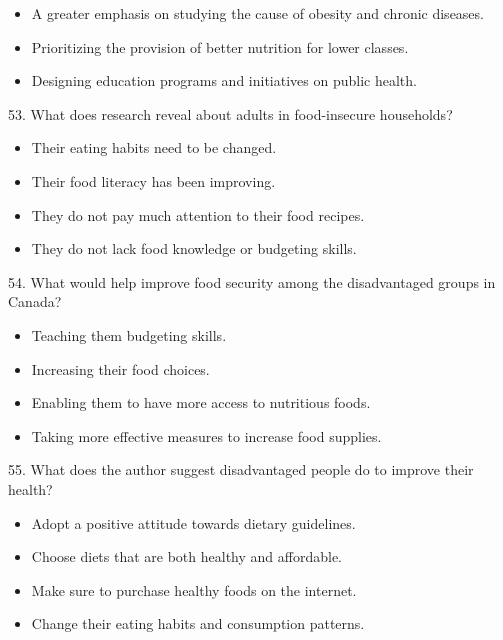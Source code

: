 \documentclass[UTF8,11pt]{ctexart}
\begin{document}
\begin{itemize}[leftmargin=2em,itemsep=.2em,topsep=.4em]\item[B.] A greater emphasis on studying the cause of obesity and chronic diseases.
\item[C.] Prioritizing the provision of better nutrition for lower classes.
\item[D.] Designing education programs and initiatives on public health.
\end{itemize}

53. What does research reveal about adults in food-insecure households?


\begin{itemize}[leftmargin=2em,itemsep=.2em,topsep=.4em]\item[A.] Their eating habits need to be changed.
\item[B.] Their food literacy has been improving.
\item[C.] They do not pay much attention to their food recipes.
\item[D.] They do not lack food knowledge or budgeting skills.
\end{itemize}

54. What would help improve food security among the disadvantaged groups in Canada?


\begin{itemize}[leftmargin=2em,itemsep=.2em,topsep=.4em]\item[A.] Teaching them budgeting skills.
\item[B.] Increasing their food choices.
\item[C.] Enabling them to have more access to nutritious foods.
\item[D.] Taking more effective measures to increase food supplies.
\end{itemize}

55. What does the author suggest disadvantaged people do to improve their health?


\begin{itemize}[leftmargin=2em,itemsep=.2em,topsep=.4em]\item[A.] Adopt a positive attitude towards dietary guidelines.
\item[B.] Choose diets that are both healthy and affordable.
\item[C.] Make sure to purchase healthy foods on the internet.
\item[D.] Change their eating habits and consumption patterns.
\end{itemize}
\end{document}
